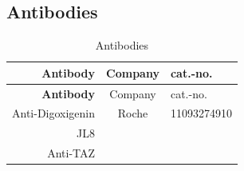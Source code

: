 \documentclass[11pt,singlespacinge,twoside]{reedthesis} %
\begin{document}
\hypertarget{mat-anitb}{%
\subsection{Antibodies}\label{mat-anitb}}
\begin{longtable}[]{@{}rcl@{}}
\caption{\label{tab:mat-antib} Antibodies}\tabularnewline
\toprule
\begin{minipage}[b]{0.21\columnwidth}\raggedleft
\textbf{Antibody}\strut
\end{minipage} & \begin{minipage}[b]{0.54\columnwidth}\centering
Company\strut
\end{minipage} & \begin{minipage}[b]{0.16\columnwidth}\raggedright
cat.-no.\strut
\end{minipage}\tabularnewline
\midrule
\endfirsthead
\toprule
\begin{minipage}[b]{0.21\columnwidth}\raggedleft
\textbf{Antibody}\strut
\end{minipage} & \begin{minipage}[b]{0.54\columnwidth}\centering
Company\strut
\end{minipage} & \begin{minipage}[b]{0.16\columnwidth}\raggedright
cat.-no.\strut
\end{minipage}\tabularnewline
\midrule
\endhead
\begin{minipage}[t]{0.21\columnwidth}\raggedleft
Anti-Digoxigenin\strut
\end{minipage} & \begin{minipage}[t]{0.54\columnwidth}\centering
Roche\strut
\end{minipage} & \begin{minipage}[t]{0.16\columnwidth}\raggedright
11093274910\strut
\end{minipage}\tabularnewline
\begin{minipage}[t]{0.21\columnwidth}\raggedleft
JL8\strut
\end{minipage} & \begin{minipage}[t]{0.54\columnwidth}\centering
\strut
\end{minipage} & \begin{minipage}[t]{0.16\columnwidth}\raggedright
\strut
\end{minipage}\tabularnewline
\begin{minipage}[t]{0.21\columnwidth}\raggedleft
Anti-TAZ\strut
\end{minipage} & \begin{minipage}[t]{0.54\columnwidth}\centering
\strut
\end{minipage} & \begin{minipage}[t]{0.16\columnwidth}\raggedright
\strut
\end{minipage}\tabularnewline
\bottomrule
\end{longtable}
\end{document}
